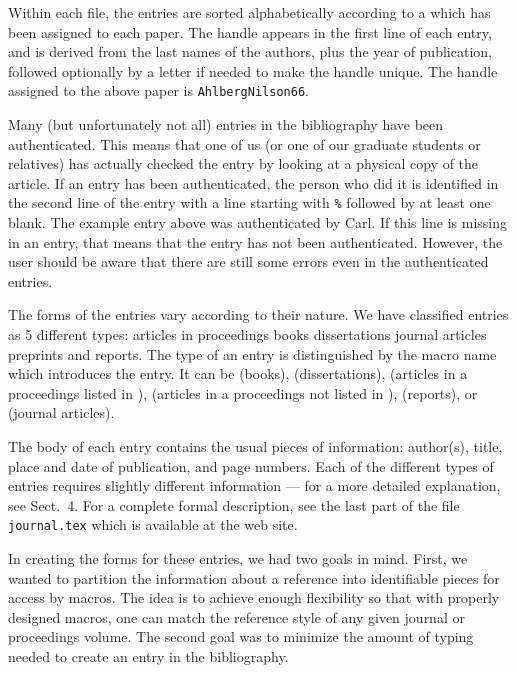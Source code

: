 Within each file, the entries are
sorted alphabetically according to a  which has been
assigned to each paper.  The handle appears in the first
line of each entry, and is
derived from the last names of the authors, plus the year of
publication, followed optionally by a letter if needed to make the
handle unique.  The handle assigned to the above paper
is {\tt AhlbergNilson66}.

Many (but unfortunately not all)
entries in the bibliography have been
authenticated. This means that one of us (or
one of our graduate students or relatives) has actually checked the
entry by looking at a physical copy of the article.
If an entry has been
authenticated, the person who did it is identified in
the second line of the entry with a line starting with {\tt \%}
followed by at least one blank.
The example entry above was authenticated by Carl.
If this line is missing in an entry, that means that the
entry has not been authenticated. However, the user should be
aware that there are still some errors
even in the authenticated entries.

The forms of the entries vary according to their nature.  We
have classified entries as 5 different types:
\sm
{} articles in proceedings
 books
 dissertations
 journal articles
 preprints and reports.
\ms
The type of an entry is distinguished by the \Tex macro name which
introduces the entry.  It can be  (books),
  (dissertations),  (articles in a proceedings listed
in ),
 (articles in a proceedings not listed in ),
 (reports), or  (journal articles).

The body of each entry contains the usual pieces of information:
author(s), title, place and date of publication, and page
numbers.  Each of the different types of entries requires slightly
different information --- for a more detailed explanation, see
Sect.~4. For a complete formal description, see the last part of the file
{\tt journal.tex} which is available at the web site.

In creating the forms for these entries, we had two goals in mind.
First, we wanted to partition the information about a reference
into identifiable pieces for access by \Tex macros.
The idea is to achieve enough flexibility so that with
properly designed \Tex macros, one can match
the reference style of any given journal or proceedings volume.
The second goal was to minimize the amount of typing needed to
create an entry in the bibliography.

